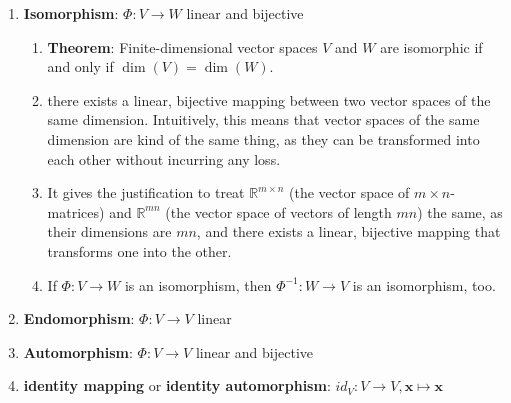 \begin{enumerate}
    \item \textbf{Isomorphism}: $\Phi : V \to W$ linear and bijective
    \hfill \cite{mfml/book/mml/Deisenroth-Faisal-Ong}
    \begin{enumerate}
        \item \textbf{Theorem}: Finite-dimensional vector spaces $V$ and $W$ are isomorphic if and only if $\dim(V ) = \dim(W)$.
        \hfill \cite{mfml/book/mml/Deisenroth-Faisal-Ong}

        \item there exists a linear, bijective mapping between two vector spaces of the same dimension.
        Intuitively, this means that vector spaces of the same dimension are kind of the same thing, as they can be transformed into each other without incurring any loss.
        \hfill \cite{mfml/book/mml/Deisenroth-Faisal-Ong}

        \item It gives the justification to treat $\mathbb{R}^{m\times n}$ (the vector space of $m \times n$-matrices) and $\mathbb{R}^{mn}$ (the vector space of vectors of length $mn$) the same, as their dimensions are $mn$, and there exists a linear, bijective mapping that transforms one into the other.
        \hfill \cite{mfml/book/mml/Deisenroth-Faisal-Ong}

        \item If $\Phi : V \to W$ is an isomorphism, then $\Phi ^{-1} : W \to V$ is an isomorphism, too.
        \hfill \cite{mfml/book/mml/Deisenroth-Faisal-Ong}
    \end{enumerate}

    \item \textbf{Endomorphism}: $\Phi : V \to V$ linear
    \hfill \cite{mfml/book/mml/Deisenroth-Faisal-Ong}

    \item \textbf{Automorphism}: $\Phi : V \to V$ linear and bijective
    \hfill \cite{mfml/book/mml/Deisenroth-Faisal-Ong}

    \item \textbf{identity mapping} or \textbf{identity automorphism}: $id_V : V \to V , \bm{x} \mapsto \bm{x}$
    \hfill \cite{mfml/book/mml/Deisenroth-Faisal-Ong}
\end{enumerate}



















